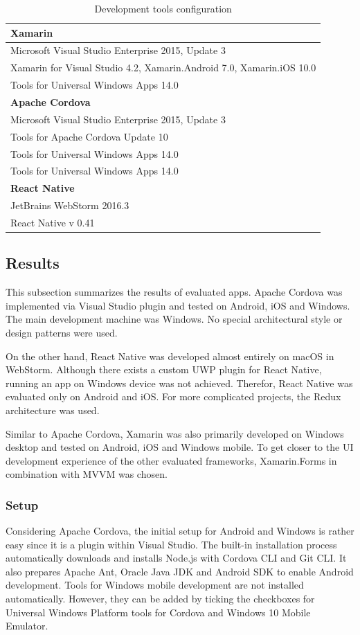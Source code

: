\documentclass[english,master,public,dept460,male,cpdeclaration,oneside]{diploma}
\begin{document}
\begin{table}[!h]
	\centering
	\caption{Development tools configuration}
	\begin{tabular}{l}
		\toprule
		\textbf{Xamarin}\\
		\midrule
		Microsoft Visual Studio Enterprise 2015, Update 3 \\
		Xamarin for Visual Studio 4.2, Xamarin.Android 7.0, Xamarin.iOS 10.0 \\
		Tools for Universal Windows Apps 14.0 \\
		\midrule
		\textbf{Apache Cordova}\\
		\midrule
		Microsoft Visual Studio Enterprise 2015, Update 3 \\
		Tools for Apache Cordova Update 10 \\
		Tools for Universal Windows Apps 14.0 \\
		Tools for Universal Windows Apps 14.0 \\
		\midrule
		\textbf{React Native}\\
		\midrule
		JetBrains WebStorm 2016.3 \\
		React Native v 0.41\\	
		\midrule	
	\end{tabular}
\end{table}

\subsection{Results}

This subsection summarizes the results of evaluated apps. Apache Cordova was implemented via Visual Studio plugin and tested on Android, iOS and Windows. The main development machine was Windows. No special architectural style or design patterns were used.

On the other hand, React Native was developed almost entirely on macOS in WebStorm. Although there exists a custom UWP plugin for React Native, running an app on Windows device was not achieved. Therefor, React Native was evaluated only on Android and iOS. For more complicated projects, the Redux architecture was used. 

Similar to Apache Cordova, Xamarin was also primarily developed on Windows desktop and tested on Android, iOS and Windows mobile. To get closer to the UI development experience of the other evaluated frameworks, Xamarin.Forms in combination with MVVM was chosen.

\subsubsection{Setup}
Considering Apache Cordova, the initial setup for Android and Windows is rather easy since it is a plugin within Visual Studio. The built-in installation process automatically downloads and installs Node.js with Cordova CLI and Git CLI. It also prepares Apache Ant, Oracle Java JDK and Android SDK to enable Android development. Tools for Windows mobile development are not installed automatically. However, they can be added by ticking the checkboxes for Universal Windows Platform tools for Cordova and Windows 10 Mobile Emulator. 
\end{document}
